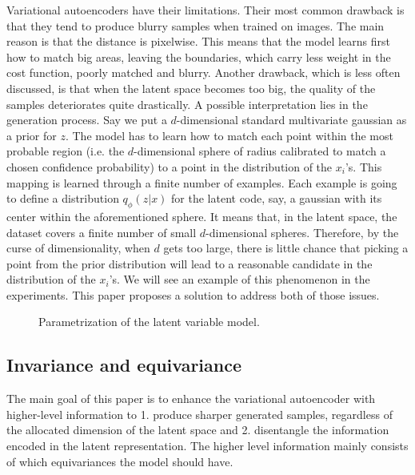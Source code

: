 \documentclass[letterpaper, twoside]{article}
\begin{document}
    Variational autoencoders have their limitations. Their most common drawback is that they tend to produce blurry samples when trained on images. The main reason is that the distance is pixelwise. This means that the model learns first how to match big areas, leaving the boundaries, which carry less weight in the cost function, poorly matched and blurry. Another drawback, which is less often discussed, is that when the latent space becomes too big, the quality of the samples deteriorates quite drastically. A possible interpretation lies in the generation process. Say we put a $d$-dimensional standard multivariate gaussian as a prior for $z$. The model has to learn how to match each point within the most probable region (i.e. the $d$-dimensional sphere of radius calibrated to match a chosen confidence probability) to a point in the distribution of the $x_i$'s. This mapping is learned through a finite number of examples. Each example is going to define a distribution $q_\phi(z|x)$ for the latent code, say, a gaussian with its center within the aforementioned sphere. It means that, in the latent space, the dataset covers a finite number of small $d$-dimensional spheres. Therefore, by the curse of dimensionality, when $d$ gets too large, there is little chance that picking a point from the prior distribution will lead to a reasonable candidate in the distribution of the $x_i$'s.
    We will see an example of this phenomenon in the experiments. This paper proposes a solution to address both of those issues.


    \begin{figure}
    \centering
    \caption{Parametrization of the latent variable model.}
    \label{vaegraphmodel}
    \end{figure}

  \subsection{Invariance and equivariance}
        The main goal of this paper is to enhance the variational autoencoder with higher-level information to 1. produce sharper generated samples, regardless of the allocated dimension of the latent space and 2. disentangle the information encoded in the latent representation. The higher level information mainly consists of which equivariances the model should have. \\
\end{document}
